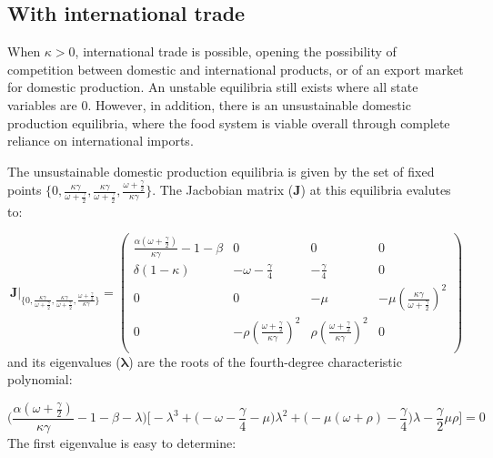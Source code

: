 \documentclass[12pt]{article}
\begin{document}
\subsection{With international trade}
When $\kappa > 0$, international trade is possible, opening the possibility of competition between domestic and international products, or of an export market for domestic production. An unstable equilibria still exists where all state variables are 0. However, in addition, there is an unsustainable domestic production equilibria, where the food system is viable overall through complete reliance on international imports.

The unsustainable domestic production equilibria is given by the set of fixed points $\{0, \frac{\kappa \gamma}{\omega + \frac{\gamma}{2}}, \frac{\kappa \gamma}{\omega + \frac{\gamma}{2}}, \frac{\omega + \frac{\gamma}{2}}{\kappa \gamma}\}$. The Jacbobian matrix ($\boldsymbol{J}$) at this equilibria evalutes to:

\begin{equation}
  \boldsymbol{J} \Big |_{\big \{0, \frac{\kappa \gamma}{\omega + \frac{\gamma}{2}}, \frac{\kappa \gamma}{\omega + \frac{\gamma}{2}}, \frac{\omega + \frac{\gamma}{2}}{\kappa \gamma}\big \}} =
  \begin{pmatrix}
    \frac{\alpha(\omega + \frac{\gamma}{2})}{\kappa \gamma} - 1 - \beta   &    0     &     0    &  0 \\
    \delta (1 - \kappa) & - \omega - \frac{\gamma}{4}  &  - \frac{\gamma}{4} & 0 \\
    0      &           0            & -\mu     & - \mu (\frac{\kappa \gamma}{\omega + \frac{\gamma}{2}})^2\\
    0      &   - \rho (\frac{\omega + \frac{\gamma}{2}}{\kappa \gamma})^2    & \rho (\frac{\omega + \frac{\gamma}{2}}{\kappa \gamma})^2 & 0 \\
  \end{pmatrix}
\end{equation}
%
and its eigenvalues ($\boldsymbol{\lambda}$) are the roots of the fourth-degree characteristic polynomial:

\begin{equation}
  \Big(\frac{\alpha(\omega + \frac{\gamma}{2})}{\kappa \gamma} - 1 - \beta - \lambda\Big) \Big[ - \lambda^3 + \big(-\omega - \frac{\gamma}{4} - \mu\big) \lambda^2 + \big(- \mu(\omega + \rho) - \frac{\gamma}{4}\big) \lambda - \frac{\gamma}{2} \mu \rho\Big] = 0
\end{equation}
%
The first eigenvalue is easy to determine:
\end{document}
